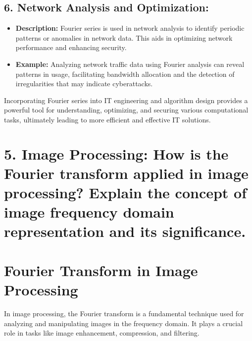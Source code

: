 \documentclass[11pt]{article}
\begin{document}
\hypertarget{network-analysis-and-optimization}{%
\subsection{\texorpdfstring{6. \textbf{Network Analysis and
Optimization:}}{6. Network Analysis and Optimization:}}\label{network-analysis-and-optimization}}

\begin{itemize}
\item
  \textbf{Description:} Fourier series is used in network analysis to
  identify periodic patterns or anomalies in network data. This aids in
  optimizing network performance and enhancing security.
\item
  \textbf{Example:} Analyzing network traffic data using Fourier
  analysis can reveal patterns in usage, facilitating bandwidth
  allocation and the detection of irregularities that may indicate
  cyberattacks.
\end{itemize}

Incorporating Fourier series into IT engineering and algorithm design
provides a powerful tool for understanding, optimizing, and securing
various computational tasks, ultimately leading to more efficient and
effective IT solutions.

    \hypertarget{image-processing-how-is-the-fourier-transform-applied-in-image-processing-explain-the-concept-of-image-frequency-domain-representation-and-its-significance.}{%
\section{5. Image Processing: How is the Fourier transform applied in
image processing? Explain the concept of image frequency domain
representation and its
significance.}\label{image-processing-how-is-the-fourier-transform-applied-in-image-processing-explain-the-concept-of-image-frequency-domain-representation-and-its-significance.}}

    \hypertarget{fourier-transform-in-image-processing}{%
\section{Fourier Transform in Image
Processing}\label{fourier-transform-in-image-processing}}

In image processing, the Fourier transform is a fundamental technique
used for analyzing and manipulating images in the frequency domain. It
plays a crucial role in tasks like image enhancement, compression, and
filtering.
\end{document}
